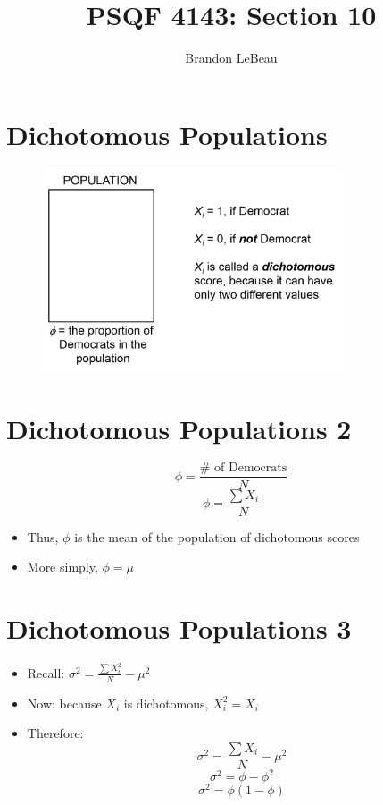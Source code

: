 \documentclass[12pt]{article}
\title{PSQF 4143: Section 10}
\author{Brandon LeBeau}
\date{}
\begin{document}
\maketitle

\section{Dichotomous Populations}\label{dichotomous-populations}

\begin{figure}[H]
\centering
\includegraphics[width=3.5in]{dich_population.png}
\caption{}
\end{figure}

\section{Dichotomous Populations 2}\label{dichotomous-populations-2}

\[ \phi = \frac{\mbox{# of Democrats}}{N} \]
\[ \phi = \frac{\sum X_{i}}{N} \]

\begin{itemize}
\itemsep1pt\parskip0pt
\item
  Thus, \(\phi\) is the mean of the population of dichotomous scores
\item
  More simply, \(\phi = \mu\)
\end{itemize}

\section{Dichotomous Populations 3}\label{dichotomous-populations-3}

\begin{itemize}
\itemsep1pt\parskip0pt
\item
  Recall: \(\sigma^2 = \frac{\sum X_{i}^{2}}{N} - \mu^2\)
\item
  Now: because \(X_{i}\) is dichotomous, \(X_{i}^{2} = X_{i}\)
\item
  Therefore: \[\sigma^{2} = \frac{\sum X_{i}}{N} - \mu^2\]
  \[\sigma^2 = \phi - \phi^2\] \[ \sigma^2 = \phi (1 - \phi)\]
\end{itemize}
\end{document}
